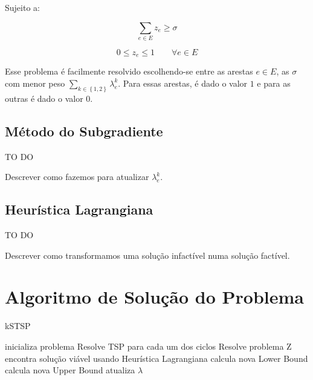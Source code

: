 \documentclass{article}
\newcommand{\Set}[1]{\ensuremath{\left\{#1\right\}}}
\newcommand{\Sum}[1]{\ensuremath{\displaystyle\sum\limits_{#1}}}
\newcommand{\edge}{\ensuremath{e}}
\newcommand{\edges}{\ensuremath{E}}
\newcommand{\ncycles}{2}
\newcommand{\allCycles}{\ensuremath{\Set{1, \ncycles}}}
\newcommand{\cycle}{\ensuremath{k}}
\newcommand{\ze}{\ensuremath{z_{\edge}}}
\newcommand{\similarity}{\ensuremath{\sigma}}
\newcommand{\lagrange}{\ensuremath{\lambda}}
\newcommand{\lagrangeke}{\ensuremath{\lagrange_{\edge}^{\cycle}}}
\begin{document}
Sujeito a:

\begin{equation}
	\Sum{\edge \in \edges} \ze \geqslant \similarity
\end{equation}

\begin{equation}
	\label{constraint:value of ze}
	0 \leqslant \ze \leqslant 1
	\qquad
	\forall \edge \in \edges
\end{equation}

Esse problema é facilmente resolvido escolhendo-se entre as arestas $\edge \in \edges$, as $\similarity$ com menor peso $\Sum{\cycle \in \allCycles} \lagrangeke$. Para essas arestas, é dado o valor $1$ e para as outras é dado o valor $0$.

\subsection{Método do Subgradiente}

{\huge TO DO}

Descrever como fazemos para atualizar $\lagrangeke$.

\subsection{Heurística Lagrangiana}

{\huge TO DO}

Descrever como transformamos uma solução infactível numa solução factível.

\section{Algoritmo de Solução do Problema}


\begin{algorithm}
\caption{kSTSP}
\begin{algorithmic}
    \STATE inicializa problema
    \STATE Resolve TSP para cada um dos ciclos
    \STATE Resolve problema Z
    \STATE encontra solução viável usando Heurística Lagrangiana
    \STATE calcula nova Lower Bound
    \STATE calcula nova Upper Bound
    \STATE atualiza $\lagrange$
    \ENDWHILE
\end{algorithmic}
\end{algorithm}
\end{document}
